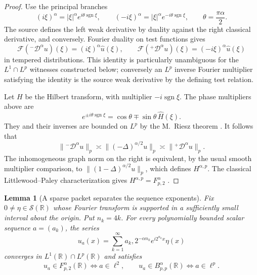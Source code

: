 \documentclass[11pt]{article}
\newtheorem{lemma}{Lemma}
\newcommand{\R}{\mathbb R}
\newcommand{\F}{\mathcal F}
\newcommand{\Dminus}{{}^{-}\!\mathcal D^{\alpha}}
\newcommand{\Dplus}{{}^{+}\!\mathcal D^{\alpha}}
\begin{document}
\begin{proof}
Use the principal branches
\[
 (i\xi)^\alpha=|\xi|^\alpha e^{i\theta\operatorname{sgn}\xi},
 \qquad
 (-i\xi)^\alpha=|\xi|^\alpha e^{-i\theta\operatorname{sgn}\xi},
 \qquad \theta=\frac{\pi\alpha}{2}.
\]
The source defines the left weak derivative by duality against the right
classical derivative, and conversely.  Fourier duality on test functions gives
\[
 \F(\Dminus u)(\xi)=(i\xi)^\alpha\widehat u(\xi),
 \qquad
 \F(\Dplus u)(\xi)=(-i\xi)^\alpha\widehat u(\xi)
\]
in tempered distributions.  This identity is particularly unambiguous for
the $L^1\cap L^p$ witnesses constructed below; conversely an $L^p$ inverse
Fourier multiplier satisfying the identity is the source weak derivative by
the defining test relation.

Let $H$ be the Hilbert transform, with multiplier $-i\operatorname{sgn}\xi$.
The phase multipliers above are
\[
 e^{\pm i\theta\operatorname{sgn}\xi}
 =\cos\theta\mp\sin\theta\,\widehat H(\xi).
\]
They and their inverses are bounded on $L^p$ by the M.~Riesz theorem
\cite{Stein}.  It follows that
\[
 \|\Dminus u\|_p\asymp\|(-\Delta)^{\alpha/2}u\|_p
 \asymp\|\Dplus u\|_p.
\]
The inhomogeneous graph norm on the right is equivalent, by the usual smooth
multiplier comparison, to
$\|(1-\Delta)^{\alpha/2}u\|_p$, which defines $H^{\alpha,p}$.  The classical
Littlewood--Paley characterization gives
$H^{\alpha,p}=F^\alpha_{p,2}$ \cite{Triebel}.
\end{proof}

\begin{lemma}[A sparse packet separates the sequence exponents]
\label{lem:packets}
Fix $0\ne\eta\in\mathcal S(\R)$ whose Fourier transform is supported in a
sufficiently small interval about the origin.  Put $n_k=4k$.  For every
polynomially bounded scalar sequence $a=(a_k)$, the series
\[
 u_a(x)=\sum_{k=1}^\infty a_k,2^{-\alpha n_k}
 e^{i2^{n_k}x}\eta(x)                                      \tag{1}
\]
converges in $L^1(\R)\cap L^p(\R)$ and satisfies
\[
 u_a\in F^\alpha_{p,2}(\R)\iff a\in\ell^2,
 \qquad
 u_a\in B^\alpha_{p,p}(\R)\iff a\in\ell^p.               \tag{2}
\]
\end{lemma}
\end{document}
